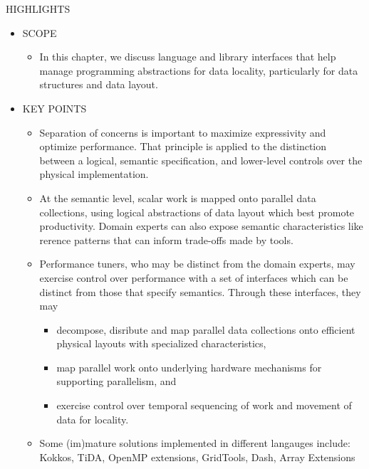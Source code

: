 HIGHLIGHTS
\begin{itemize}
\item SCOPE
  \begin{itemize}
  \item In this chapter, we discuss language and library interfaces that help manage programming abstractions for data locality, particularly for data structures and data layout. 
  \end{itemize}
\item KEY POINTS
  \begin{itemize}
  \item Separation of concerns is important to maximize expressivity and optimize performance.  That principle is applied to the distinction between a logical, semantic specification, and lower-level controls over the physical implementation.
  \item At the semantic level, scalar work is mapped onto parallel data collections, using logical abstractions of data layout which best promote productivity.  Domain experts can also expose semantic characteristics like rerence patterns that can inform trade-offs made by tools.
  \item Performance tuners, who may be distinct from the domain experts, may exercise control over performance with a set of interfaces which can be distinct from those that specify semantics.  Through these interfaces, they may 
  \begin{itemize}
  \item decompose, disribute and map parallel data collections onto efficient physical layouts with specialized characteristics, 
  \item map parallel work onto underlying hardware mechanisms for supporting parallelism, and 
  \item exercise control over temporal sequencing of work and movement of data for locality.
  \end{itemize}
  \item Some (im)mature solutions implemented in different langauges include: Kokkos, TiDA, OpenMP extensions, GridTools, Dash, Array Extensions
  \end{itemize}


\end{itemize}
